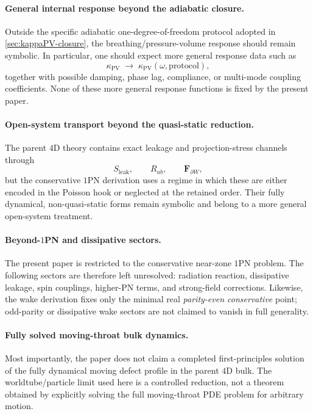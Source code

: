 \documentclass[11pt]{article}
\newcommand{\kPV}{\kappa_{\mathrm{PV}}}
\newcommand{\Sleak}{S_{\mathrm{leak}}}
\begin{document}
\paragraph{General internal response beyond the adiabatic closure.}
Outside the specific adiabatic one-degree-of-freedom protocol adopted in
\cref{sec:kappaPV-closure}, the breathing/pressure-volume response should remain symbolic.
In particular, one should expect more general response data such as
\begin{equation}
\kPV \;\to\; \kPV(\omega,\text{protocol}),
\label{eq:symbolic-kPV-general}
\end{equation}
together with possible damping, phase lag, compliance, or multi-mode coupling
coefficients. None of these more general response functions is fixed by the present paper.

\paragraph{Open-system transport beyond the quasi-static reduction.}
The parent \(4\)D theory contains exact leakage and projection-stress channels through
\begin{equation}
\Sleak,
\qquad
R_{ab},
\qquad
\mathbf F_{\partial W},
\label{eq:symbolic-open-system}
\end{equation}
but the conservative \(1\)PN derivation uses a regime in which these are either encoded in
the Poisson hook or neglected at the retained order. Their fully dynamical, non-quasi-static
forms remain symbolic and belong to a more general open-system treatment.

\paragraph{Beyond-\(1\)PN and dissipative sectors.}
The present paper is restricted to the conservative near-zone \(1\)PN problem. The
following sectors are therefore left unresolved: radiation reaction, dissipative leakage,
spin couplings, higher-PN terms, and strong-field corrections.
Likewise, the wake derivation fixes only the minimal real \emph{parity-even conservative}
point; odd-parity or dissipative wake sectors are not claimed to vanish in full generality.

\paragraph{Fully solved moving-throat bulk dynamics.}
Most importantly, the paper does not claim a completed first-principles solution of the
fully dynamical moving defect profile in the parent \(4\)D bulk. The worldtube/particle
limit used here is a controlled reduction, not a theorem obtained by explicitly solving
the full moving-throat PDE problem for arbitrary motion.
\end{document}
